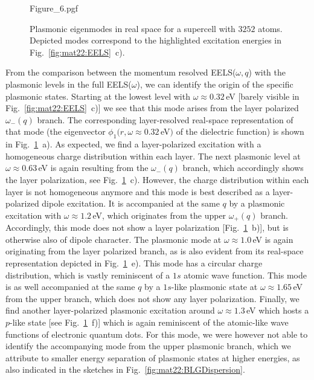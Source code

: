 \begin{figure}
    \centering
    {Figure_6.pgf}
    \caption{Plasmonic eigenmodes in real space for a supercell with $3252$ atoms. Depicted modes correspond to the highlighted excitation energies in Fig.~\ref{fig:mat22:EELS}~c).}
    \label{fig:mat22:modes}
\end{figure}

From the comparison between the momentum resolved EELS($\omega,q$) with the plasmonic levels in the full EELS($\omega$), we can identify the origin of the specific plasmonic states. Starting at the lowest level with $\omega \approx 0.32\,$eV [barely visible in Fig.~\ref{fig:mat22:EELS}~c)] we see that this mode arises from the layer polarized $\omega_-(q)$ branch. %
The corresponding layer-resolved real-space representation of that mode (the eigenvector $\phi_1(r, \omega\approx 0.32\,$eV$)$ of the dielectric function) is shown in Fig.~\ref{fig:mat22:modes}~a). As expected, we find a layer-polarized excitation with a homogeneous charge distribution within each layer.  The next plasmonic level at $\omega \approx 0.63\,$eV is again resulting from the $\omega_-(q)$ branch, which accordingly shows the layer polarization, see Fig.~\ref{fig:mat22:modes}~c). However, the charge distribution within each layer is not homogeneous anymore and this mode is best described as a layer-polarized dipole excitation. It is accompanied at the same $q$ by a plasmonic excitation with $\omega \approx 1.2\,$eV, which originates from the upper $\omega_+(q)$ branch.
Accordingly, this mode does not show a layer polarization [Fig.~\ref{fig:mat22:modes}~b)], but is otherwise also of dipole character. The plasmonic mode at $\omega \approx 1.0\,$eV is again originating from the layer polarized branch, as is also evident from its real-space representation depicted in Fig.~\ref{fig:mat22:modes}~e). This mode has a circular charge distribution, which is vastly reminiscent of a $1s$ atomic wave function. This mode is as well accompanied at the same $q$ by a $1s$-like plasmonic state at $\omega \approx 1.65\,$eV from the upper branch, %
which does not show any layer polarization. Finally, we find another layer-polarized plasmonic excitation around $\omega \approx 1.3\,$eV which hosts a $p$-like state [see Fig.~\ref{fig:mat22:modes}~f)] which is again reminiscent of the atomic-like wave functions of electronic quantum dots. For this mode, we were however not able to identify the accompanying mode from the upper plasmonic branch, which we attribute to smaller energy separation of plasmonic states at higher energies, as also indicated in the sketches in Fig.~\ref{fig:mat22:BLGDispersion}.

